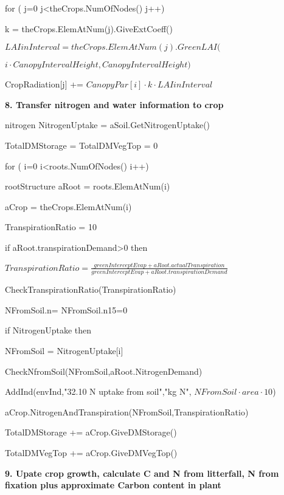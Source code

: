 \documentclass[%
]{scrartcl}
\begin{document}
    \quad	    for ( j=0 j<theCrops.NumOfNodes() j++)
      
      \quad	     \quad	    k = theCrops.ElemAtNum(j).GiveExtCoeff()

         \quad	   \quad	  $ LAIinInterval = theCrops.ElemAtNum(j).GreenLAI($

\quad	   \quad $i 
\cdot CanopyIntervalHeight,CanopyIntervalHeight)$
         
  \quad	\quad	  CropRadiation[j] += $CanopyPar[i] \cdot k \cdot LAIinInterval$
   	
   

 \textbf{8. Transfer nitrogen and water information to crop}

   nitrogen   NitrogenUptake  = aSoil.GetNitrogenUptake()
   
     TotalDMStorage = 
     TotalDMVegTop = 0
     
   for ( i=0 i<roots.NumOfNodes() i++)
  
  \quad    rootStructure   aRoot = roots.ElemAtNum(i)
   
\quad 	aCrop = theCrops.ElemAtNum(i)
   
\quad 	  TranspirationRatio = 10
   
\quad    if aRoot.transpirationDemand>0 then
   
 \quad \quad   	$TranspirationRatio = \tfrac{greenInterceptEvap+aRoot.actualTranspiration}{greenInterceptEvap+aRoot.transpirationDemand}$
  
 \quad \quad    CheckTranspirationRatio(TranspirationRatio)
    	
    	
  \quad    NFromSoil.n=
      NFromSoil.n15=0

  \quad 	if NitrogenUptake then
	   
  \quad    	  \quad	 NFromSoil = NitrogenUptake[i]

  \quad    	  \quad	 CheckNfromSoil(NFromSoil,aRoot.NitrogenDemand)

  \quad    	  \quad	 AddInd(envInd,"32.10 N uptake from soil","kg N",
$NFromSoil \cdot area \cdot 10$)
      
  \quad    aCrop.NitrogenAndTranspiration(NFromSoil,TranspirationRatio)
   
 \quad  TotalDMStorage += aCrop.GiveDMStorage()
    
 \quad TotalDMVegTop += aCrop.GiveDMVegTop()
	

  \textbf{9. Upate crop growth, 
calculate C and N from litterfall, N from fixation plus approximate Carbon content in plant}
   
\end{document}
